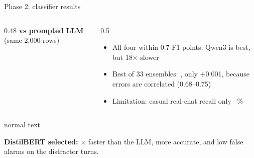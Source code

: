 \documentclass[aspectratio=169,11pt]{beamer}
\newcommand{\takeaway}[1]{\vspace{4pt}\begin{beamercolorbox}[sep=6pt,rounded=true]{normal text}\colorbox{boxblue}{\parbox{0.93\linewidth}{\small #1}}\end{beamercolorbox}}
\begin{document}
\begin{frame}{Phase 2: classifier results}
\centering
\resizebox{\linewidth}{!}{}
\vspace{6pt}
\begin{columns}[T]
\begin{column}{0.48\textwidth}
\textbf{vs prompted LLM} (same 2{,}000 rows)\\[3pt]
\end{column}
\begin{column}{0.5\textwidth}
\begin{itemize}\footnotesize
  \item All four within 0.7 F1 points; Qwen3 is best, but 18$\times$ slower
  \item Best of 33 ensembles: \pBestEnsFOne, only +0.001, because errors are correlated (0.68--0.75)
  \item Limitation: casual real-chat recall only \pOasstRecLo--\pOasstRecHi\%
\end{itemize}
\end{column}
\end{columns}
\takeaway{\textbf{DistilBERT selected:} \pSpeedup$\times$ faster than the LLM, more accurate, and low false alarms on the distractor turns.}
\end{frame}
\end{document}
